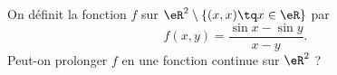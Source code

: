 \begin{exercice}[\coolexo]\label{exoLimiteContinue0010}

On définit la fonction $f$ sur $\eR^2 \setminus \{ (x,x) \tq x\in \eR \}$ par 
\begin{equation}
	f(x,y)= \frac{\sin x -\sin y}{x-y}.
\end{equation}
Peut-on prolonger $f$ en une fonction continue sur $\eR^2$ ? 

\end{exercice}
